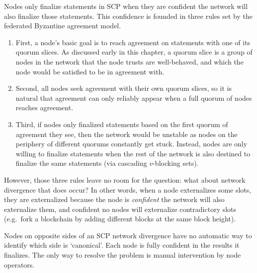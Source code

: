 Nodes only finalize statements in SCP when they are confident the network will also finalize those statements. This confidence is founded in three rules set by the federated Byzantine agreement model.

\begin{enumerate}
    \item First, a node's basic goal is to reach agreement on statements with one of its quorum slices. As discussed early in this chapter, a quorum slice is a group of nodes in the network that the node trusts are well-behaved, and which the node would be satisfied to be in agreement with.

    \item Second, all nodes seek agreement with their own quorum slices, so it is natural that agreement can only reliably appear when a full quorum of nodes reaches agreement.

    \item Third, if nodes only finalized statements based on the first quorum of agreement they see, then the network would be unstable as nodes on the periphery of different quorums constantly get stuck. Instead, nodes are only willing to finalize statements when the rest of the network is also destined to finalize the same statements (via cascading $v$-blocking sets).%
\end{enumerate}

However, those three rules leave no room for the question: what about network divergence that does occur? In other words, when a node externalizes some slots, they are externalized because the node is {\em confident} the network will also externalize them, and confident no nodes will externalize contradictory slots (e.g.\ fork a blockchain by adding different blocks at the same block height).

Nodes on opposite sides of an SCP network divergence have no automatic way to identify which side is `canonical'. Each node is fully confident in the results it finalizes. The only way to resolve the problem is manual intervention by node operators.

